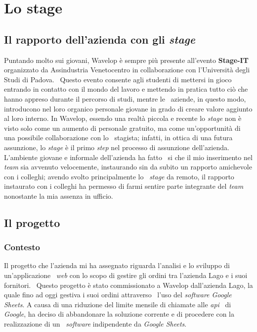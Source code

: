 
\chapter{Lo stage}
\label{cap:stage}
\section{Il rapporto dell'azienda con gli \emph{stage}}
Puntando molto sui giovani, Wavelop è sempre più presente all'evento \textbf{Stage-IT} organizzato da Assindustria Venetocentro in collaborazione con l'Università degli Studi di Padova. \
Questo evento consente agli studenti di mettersi in gioco entrando in contatto con il mondo del lavoro e mettendo in pratica tutto ciò che hanno appreso durante il percorso di studi, mentre le \
aziende, in questo modo, introducono nel loro organico personale giovane in grado di creare valore aggiunto al loro interno.
In Wavelop, essendo una realtà piccola e recente lo \emph{stage} non è visto solo come un aumento di personale gratuito, ma come un'opportunità di una possibile collaborazione con lo \
stagista; infatti, in ottica di una futura assunzione, lo \emph{stage} è il primo \emph{step} nel processo di assunzione dell'azienda. L'ambiente giovane e informale dell'azienda ha fatto \
si che il mio inserimento nel \emph{team} sia avvenuto velocemente, instaurando sin da subito un rapporto amichevole con i colleghi; avendo svolto principalmente lo \
\emph{stage} da remoto, il rapporto instaurato con i colleghi ha permesso di farmi sentire parte integrante del \emph{team} nonostante la mia assenza in ufficio.

\section{Il progetto}

\subsection{Contesto}
Il progetto che l'azienda mi ha assegnato riguarda l'analisi e lo sviluppo di un'applicazione \
\emph{web} con lo scopo di gestire gli ordini tra l'azienda Lago e i suoi fornitori. \ 
Questo progetto è stato commissionato a Wavelop dall'azienda Lago, la quale fino ad oggi gestiva i suoi ordini attraverso \
l'uso del \emph{software Google Sheets}. A causa di una riduzione del limite mensile di chiamate alle \emph{\acrshort{api}} \
di \emph{Google}, ha deciso di abbandonare la soluzione corrente e di procedere con la realizzazione di un \
\emph{software} indipendente da \emph{Google Sheets}. \\

